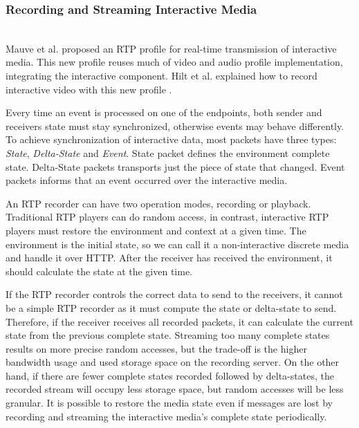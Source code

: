  \subsubsection{Recording and Streaming Interactive Media}\label{intrecord}~\\
    Mauve et al. proposed an \ac{RTP} profile for real-time transmission of interactive media\cite{interactive_stream}. This new profile reuses much of video and audio profile implementation, integrating the interactive component. Hilt et al. explained how to record interactive video with this new profile \cite{interactive_record}.

	Every time an event is processed on one of the endpoints, both sender and receivers state must stay synchronized, otherwise events may behave differently.
	To achieve synchronization of interactive data, most packets have three types: \emph{State}, \emph{Delta-State} and \emph{Event}. State packet defines the environment complete state. Delta-State packets transports just the piece of state that changed. Event packets informs that an event occurred over the interactive media. 

	An \ac{RTP} recorder can have two operation modes, recording or playback. Traditional \ac{RTP} players can do random access, in contrast, interactive \ac{RTP} players must restore the environment and context at a given time. The environment is the initial state, so we can call it a non-interactive discrete media and handle it over \ac{HTTP}. After the receiver has received the environment, it should calculate the state at the given time. 

	If the \ac{RTP} recorder controls the correct data to send to the receivers, it cannot be a simple \ac{RTP} recorder as it must compute the state or delta-state to send. Therefore, if the receiver receives all recorded packets, it can calculate the current state from the previous complete state. Streaming too many complete states results on more precise random accesses, but the trade-off is the higher bandwidth usage and used storage space on the recording server. On the other hand, if there are fewer complete states recorded followed by delta-states, the recorded stream will occupy less storage space, but random accesses will be less granular.
	It is possible to restore the media state even if messages are lost by recording and streaming the interactive media's complete state periodically.

